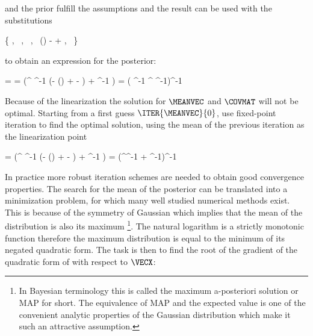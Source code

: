     and the prior  fulfill the assumptions
     and the result  can be used with
    the substitutions

    \startformula
        \{ \VECA \rightarrow \MEANVECA,~
        \MATPI \rightarrow \COVMATA,~
        \MATB \rightarrow {},~
        \VECB \rightarrow \FWD()
            -  
            + \MEANVECERR,~
        \MATQI \rightarrow \COVMATERR \}
    \stopformula

    to obtain an expression for the posterior:
    
    \startformula
    \startalign[n=2,align={right,left}]
        \NC \POSTERIOR = \NC \GAUSS{\VECX}{\MEANVEC}{\COVMAT} \NR
        \NC \MEANVEC = \NC \COVMAT (^\top
            \COVMATERR^{-1} (\VECY - \FWD()
            +   - \MEANVECERR)
            + \COVMATA^{-1} \MEANVECA) \NR
        \NC \COVMAT = \NC 
            ( \COVMATERR^{-1} ^\top
            \COVMATA^{-1})^{-1} \NR
    \stopalign
    \stopformula
    
    Because of the linearization the solution for $\MEANVEC$ and $\COVMAT$ will
    not be optimal. Starting from a first guess $\ITER{\MEANVEC}{0}$, use
    fixed-point iteration to find the optimal solution, using the mean of the
    previous iteration as the linearization point

    \startsubformulas[eq:gausspostiter]
    \placesubformula
    \startformula
    \startalign[n=3,align={right,left,right}]
        \NC {} = \NC
             (^\top
            \COVMATERR^{-1} (\VECY - \FWD()
            +   - \MEANVECERR)
            + \COVMATA^{-1} \MEANVECA) \EQCOMMA \NC \NR[eq:gausspostmeaniter][a]
        \NC {} = \NC
            (^\top \COVMATERR^{-1} 
            + \COVMATA^{-1})^{-1}
            \EQSTOP \NC \NR[eq:gausspostcoviter][b]
    \stopalign
    \stopformula
    \stopsubformulas

    In practice more robust iteration schemes are needed to obtain good
    convergence properties. The search for the mean of the posterior can be
    translated into a minimization problem, for which many well studied
    numerical methods exist. This is because of the symmetry of Gaussian which
    implies that the mean of the distribution is also its maximum \footnote{In
    Bayesian terminology this is called the maximum a-posteriori solution or
    MAP for short. The equivalence of MAP and the expected value is one of the
    convenient analytic properties of the Gaussian distribution which make it
    such an attractive assumption.}. The natural logarithm is a strictly
    monotonic function therefore the maximum distribution is equal to the
    minimum of its negated quadratic form. The task is then to find the root of
    the gradient of the quadratic form of  with
    respect to $\VECX$:

